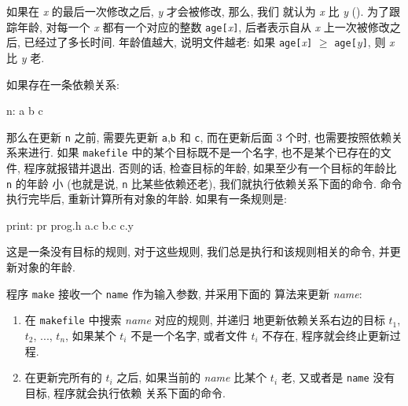 如果在 \textit{x} 的最后一次修改之后, \textit{y} 才会被修改, 那么, 我们 
就认为 \textit{x} 比 \textit{y}  (). 为了跟踪年龄,
对每一个 \textit{x} 都有一个对应的整数 \texttt{age[}\textit{x}\texttt{]},
后者表示自从 \textit{x} 上一次被修改之后, 已经过了多长时间. 年龄值越大,
说明文件越老: 如果 \texttt{age[}\textit{x}\texttt{]} $\geqslant$ 
\texttt{age[}\textit{y}\texttt{]}, 则 \textit{x} 比 \textit{y} 老.

如果存在一条依赖关系:
\begin{shell}
    n: a b c
\end{shell}
那么在更新 \texttt{n} 之前, 需要先更新 \texttt{a},\texttt{b} 和 \texttt{c},
而在更新后面 3 个时, 也需要按照依赖关系来进行. 如果 \texttt{makefile}
中的某个目标既不是一个名字, 也不是某个已存在的文件, 程序就报错并退出.
否则的话, 检查目标的年龄, 如果至少有一个目标的年龄比 \texttt{n} 的年龄
小 (也就是说, \texttt{n} 比某些依赖还老), 我们就执行依赖关系下面的命令.
命令执行完毕后, 重新计算所有对象的年龄. 如果有一条规则是:
\begin{shell}
    print:
                pr prog.h a.c b.c c.y
\end{shell}
这是一条没有目标的规则, 对于这些规则, 我们总是执行和该规则相关的命令,
并更新对象的年龄.

程序 \texttt{make} 接收一个 \texttt{name} 作为输入参数, 并采用下面的
算法来更新 \textit{name}:
\begin{enumerate}
    \item 
        在 \texttt{makefile} 中搜索 \textit{name} 对应的规则, 并递归
        地更新依赖关系右边的目标 $t_1$, $t_2$, ..., $t_n$, 如果某个 
        $t_i$ 不是一个名字, 或者文件 $t_i$ 不存在, 程序就会终止更新过程.
    \item 
        在更新完所有的 $t_i$ 之后, 如果当前的 \textit{name} 比某个
        $t_i$ 老, 又或者是 \texttt{name} 没有目标, 程序就会执行依赖
        关系下面的命令.
\end{enumerate}
